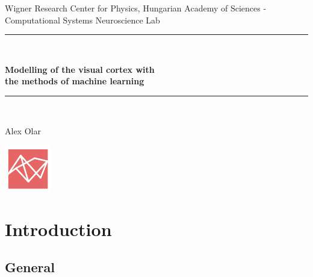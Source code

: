 \documentclass[11pt, english]{article}
\makeatletter
\newcounter{unomenos}
\gdef\@date{ \arabic{unomenos} }
\makeatother
\begin{document}
\begin{titlepage}

\begin{center}
Wigner Research Center for Physics, Hungarian Academy of Sciences - \@date\\
\vspace*{0.15in}
Computational Systems Neuroscience Lab \\
\vspace*{0.4in}
\rule{100mm}{0.1mm}\\
\vspace*{0.3in}
\begin{Large}
\textbf{Modelling of the visual cortex with \\ the methods of machine learning} \\
\end{Large}
\vspace*{0.3in}
\rule{100mm}{0.1mm}\\
\vspace*{0.4in}
\begin{large}
Alex Olar \\
\end{large}
\vfill
\includegraphics[width=2cm]{logoFAC.png}
\end{center}
\end{titlepage}

\newcommand{\CC}{C\nolinebreak\hspace{-.05em}\raisebox{.4ex}{\tiny\bf +}\nolinebreak\hspace{-.10em}\raisebox{.4ex}{\tiny\bf +}}
\def\CC{{C\nolinebreak[4]\hspace{-.05em}\raisebox{.4ex}{\tiny\bf ++}}}

\renewcommand{\thesection}{\Roman{section}.}
\renewcommand{\thesubsection}{\Roman{section}. \arabic{subsection}.}

\tableofcontents
\newpage

\section{Introduction}

\subsection{General}
\end{document}
